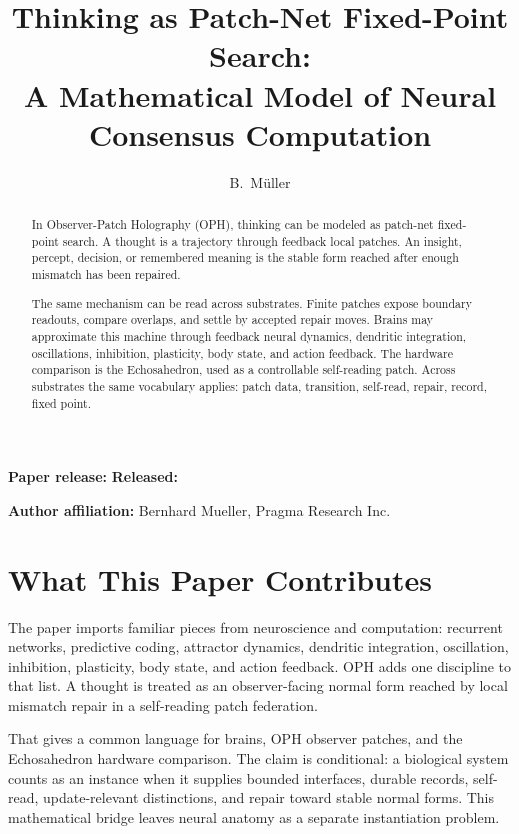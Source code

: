 \documentclass[11pt]{article}
\title{Thinking as Patch-Net Fixed-Point Search:\\
A Mathematical Model of Neural Consensus Computation}
\author{B.\ M\"uller}
\date{}
\theoremstyle{remark}
\theoremstyle{plain}
\begin{document}
\maketitle
\begin{center}
\small\textbf{Paper release:} \OPHPaperReleaseID\quad
\textbf{Released:} \OPHPaperReleaseDate
\end{center}

\begin{center}
\small\textbf{Author affiliation:} Bernhard Mueller, Pragma Research Inc.
\end{center}

\begin{abstract}
In Observer-Patch Holography (OPH), thinking can be modeled as patch-net
fixed-point search. A thought is a trajectory through feedback local patches.
An insight, percept, decision, or remembered meaning is the stable form reached
after enough mismatch has been repaired.

The same mechanism can be read across substrates. Finite patches expose boundary readouts, compare overlaps, and settle by accepted repair moves. Brains may approximate this machine through feedback neural dynamics, dendritic integration, oscillations, inhibition, plasticity, body state, and action feedback. The hardware comparison is the Echosahedron, used as a controllable self-reading patch. Across substrates the same vocabulary applies: patch data, transition, self-read, repair, record, fixed point.
\end{abstract}

\section*{What This Paper Contributes}

The paper imports familiar pieces from neuroscience and computation: recurrent
networks, predictive coding, attractor dynamics, dendritic integration,
oscillation, inhibition, plasticity, body state, and action feedback. OPH adds
one discipline to that list. A thought is treated as an observer-facing normal
form reached by local mismatch repair in a self-reading patch federation.

That gives a common language for brains, OPH observer patches, and the
Echosahedron hardware comparison. The claim is conditional: a biological
system counts as an instance when it supplies bounded interfaces, durable
records, self-read, update-relevant distinctions, and repair toward stable
normal forms. This mathematical bridge leaves neural anatomy as a separate
instantiation problem.
\end{document}
